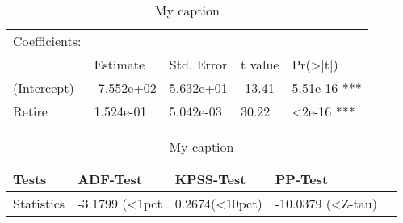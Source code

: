 \begin{table}[]
\centering
\caption{My caption}
\label{my-label}
\begin{tabular}{l | llll}
Coefficients: &            &            &         &                     \\
              & Estimate   & Std. Error & t value & Pr(\textgreater|t|) \\  \hline
(Intercept)   & -7.552e+02 & 5.632e+01  & -13.41  & 5.51e-16 ***        \\
Retire        & 1.524e-01  & 5.042e-03  & 30.22   & \textless 2e-16 ***
\end{tabular}
\end{table}


\begin{table}[]
\centering
\caption{My caption}
\label{my-label}
\begin{tabular}{l | llll}
Tests        & ADF-Test       & KPSS-Test      & PP-Test   			\\  \hline
Statistics   & -3.1799 (<1pct & 0.2674(<10pct) & -10.0379 (<Z-tau)  
\end{tabular}
\end{table}
